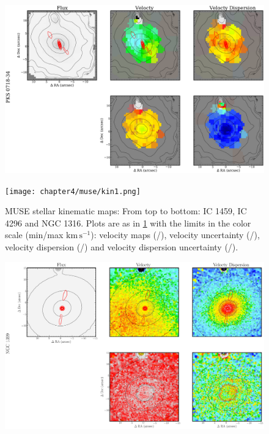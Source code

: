 		\begin{figure}
			\centering
			\includegraphics[height=0.62\textheight]{chapter4/vimos/kin4.png}
		\end{figure}

		\begin{figure}
			\centering
			\texttt{[image: chapter4/muse/kin1.png]}
			\caption[MUSE stellar kinematic maps]{MUSE stellar kinematic maps: From top to bottom: IC 1459, IC 4296 and NGC 1316. Plots are as in \ref{fig:MUSE_stellar} with the limits in the color scale (min/max $\mathrm{km \, s^{-1}}$): velocity maps (/), velocity uncertainty (/), velocity dispersion (/) and velocity dispersion uncertainty (/).}
			\label{fig:MUSE_stellar}
		\end{figure}
		\begin{figure}
			\centering
			\includegraphics[height=0.31\textheight]{chapter4/muse/kin2.png}
		\end{figure}

